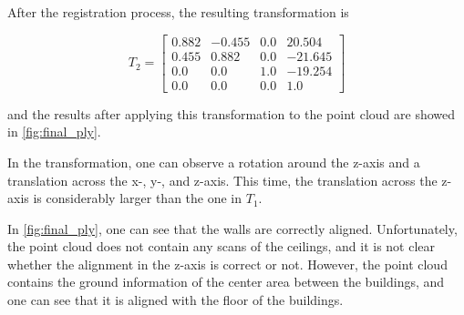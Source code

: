         After the registration process, the resulting transformation is

        \begin{equation*}
            T_2 = 
            \begin{bmatrix}
                0.882 & -0.455 & 0.0 & 20.504 \\ 
                0.455 & 0.882 & 0.0 & -21.645 \\
                0.0 & 0.0 & 1.0 & -19.254 \\
                0.0 & 0.0 & 0.0 & 1.0
            \end{bmatrix}    
        \end{equation*}
        
        and the results after applying this transformation to the point cloud are showed in \autoref{fig:final_ply}.        

        In the transformation, one can observe a rotation around the z-axis and a translation across the x-, y-, and z-axis.
        This time, the translation across the z-axis is considerably larger than the one in $T_1$.

        In \autoref{fig:final_ply}, one can see that the walls are correctly aligned.
        Unfortunately, the point cloud does not contain any scans of the ceilings, and it is not clear whether the alignment in the z-axis is correct or not. 
        However, the point cloud contains the ground information of the center area between the buildings, 
        and one can see that it is aligned with the floor of the buildings.
        
